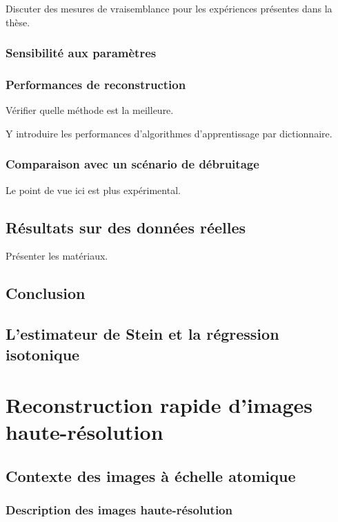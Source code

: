 \documentclass[a4paper, twoside, table, justified,
               nofonts, nobib, nohyper, 10pt, french]{tufte-book}
\begin{document}
Discuter des mesures de vraisemblance pour les expériences présentes dans la thèse.

\subsection{Sensibilité aux paramètres}

\subsection{Performances de reconstruction}
Vérifier quelle méthode est la meilleure.

Y introduire les performances d'algorithmes d'apprentissage par dictionnaire.

\subsection{Comparaison avec un scénario de débruitage}
Le point de vue ici est plus expérimental.

%
\section{Résultats sur des données réelles}
Présenter les matériaux.

%
\section{Conclusion}

\begin{subappendices}

	\section{L'estimateur de Stein et la régression isotonique}
	\lipsum[1]

\end{subappendices}



\chapter{Reconstruction rapide d'images haute-résolution}
\label{ch-chapter_4}
\dochaptoc
%
\section{Contexte des images à échelle atomique}

\subsection{Description des images haute-résolution}
\end{document}
